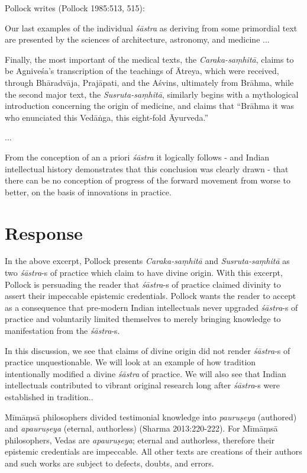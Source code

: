 Pollock writes (Pollock 1985:513, 515):
\begin{myquote}
Our last examples of the individual {\sl śāstra} as deriving from some primordial text are presented by the sciences of architecture, astronomy, and medicine ...

Finally, the most important of the medical texts, the {\sl Caraka-saṃhitā}, claims to be Agniveśa's transcription of the teachings of Ātreya, which were received, through Bhāradvāja, Prajāpati, and the Aśvins, ultimately from Brāhma, while the second major text, the {\sl Susruta-saṃhitā}, similarly begins with a mythological introduction concerning the origin of medicine, and claims that ``Brāhma it was who enunciated this Vedāṅga, this eight-fold Āyurveda.''

...

From the conception of an a priori {\sl śāstra} it logically follows - and Indian intellectual history demonstrates that this conclusion was clearly drawn - that there can be no conception of progress of the forward movement from worse to better, on the basis of innovations in practice. 
\end{myquote}

\section*{Response}

In the above excerpt, Pollock presents {\sl Caraka-saṃhitā} and {\sl Susruta-saṃhitā} as two {\sl śāstra}-s of practice which claim to have divine origin.  With this excerpt, Pollock is persuading the reader that {\sl śāstra}-s of practice claimed divinity to assert their impeccable epistemic credentials. Pollock wants the reader to accept as a consequence that pre-modern Indian intellectuals never upgraded {\sl śāstra}-s of practice and voluntarily limited themselves to merely bringing knowledge to manifestation from the {\sl śāstra}-s.

In this discussion, we see that claims of divine origin did not render {\sl śāstra}-s of practice unquestionable. We will look at an example of how tradition intentionally modified a divine {\sl śāstra} of practice. We will also see that Indian intellectuals contributed to vibrant original research long after {\sl śāstra}-s were established in tradition..

\newpage

Mīmāṃsā philosophers divided testimonial knowledge into {\sl pauruṣeya} (authored) and {\sl apauruṣeya} (eternal, authorless) (Sharma 2013:220-222). For Mīmāṃsā philosophers, Vedas are {\sl apauruṣeya}; eternal and authorless, therefore their epistemic credentials are impeccable. All other texts are creations of their authors and such works are subject to defects, doubts, and errors.

